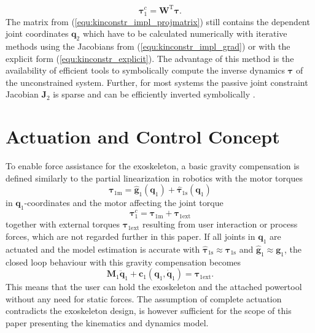\documentclass[twocolumn,10pt]{IFTOMM}
\newcommand{\bm}[1]{\boldsymbol{#1}}
\newcommand{\transp}[0]{{\mathrm{T}}}
\begin{document}
%
\begin{equation}
\bm{\tau}^{c}_{1} = \bm{W}^\transp \bm{\tau}.
\label{equ:tau_projection}
\end{equation}
%
The matrix from (\ref{equ:kinconstr_impl_projmatrix}) still contains the dependent joint coordinates $\bm{q}_2$ which have to be calculated numerically with iterative methods using the Jacobians from (\ref{equ:kinconstr_impl_grad}) or with the explicit form (\ref{equ:kinconstr_explicit}).
The advantage of this method is the availability of efficient tools to symbolically compute the inverse dynamics $\bm{\tau}$ of the unconstrained system.
Further, for most systems the passive joint constraint Jacobian $\bm{J}_2$ is sparse and can be efficiently inverted symbolically \cite{ParkChoPlo1999}.

\section{Actuation and Control Concept}
\label{sec:actuation_control}

To enable force assistance for the exoskeleton, a basic gravity compensation is defined similarly to the partial linearization in robotics with the motor torques
%
\begin{equation}
\bm{\tau}_{1\mathrm{m}} = \hat{\bm{g}}_1(\bm{q}_1) + \hat{\bm{\tau}}_{1\mathrm{s}}(\bm{q}_1)
\label{equ:GravKomp}
\end{equation}
%
in $\bm{q}_1$-coordinates and the motor affecting the joint torque
%
\begin{equation}
\bm{\tau}^c_1 = \bm{\tau}_{1\mathrm{m}} + \bm{\tau}_{1\mathrm{ext}}
\label{equ:JointTorque}
\end{equation}
%
together with external torques $\bm{\tau}_{1\mathrm{ext}}$ resulting from user interaction or process forces, which are not regarded further in this paper.
If all joints in $\bm{q}_1$ are actuated and the model estimation is accurate with $\hat{\bm{\tau}}_{1\mathrm{s}} \approx \bm{\tau}_{1\mathrm{s}}$ and $\hat{\bm{g}}_{1} \approx \bm{g}_{1}$, the closed loop behaviour with this gravity compensation becomes
%
\begin{equation}
\bm{M}_1\ddot{\bm{q}}_1+\bm{c}_1(\bm{q}_1,\dot{\bm{q}}_1) = \bm{\tau}_{1\mathrm{ext}}.
\label{equ:closedloop}
\end{equation}
%
This means that the user can hold the exoskeleton and the attached powertool without any need for static forces.
The assumption of complete actuation contradicts the exoskeleton design, is however sufficient for the scope of this paper presenting the kinematics and dynamics model.
\end{document}
